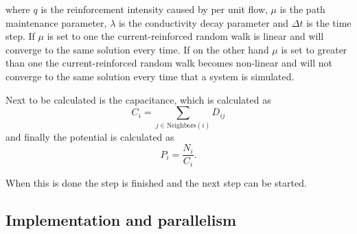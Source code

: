 where $q$ is the reinforcement intensity caused by per unit flow, $\mu$ is the path maintenance parameter, $\lambda$ is the conductivity decay parameter and $\Delta t$ is the time step. If $\mu$ is set to one the current-reinforced random walk is linear and will converge to the same solution every time. If on the other hand $\mu$ is set to greater than one the current-reinforced random walk becomes non-linear and will not converge to the same solution every time that a system is simulated. 

Next to be calculated is the capacitance, which is calculated as 
 \begin{equation}
 C_i = \sum_{j \in \text{Neighbors}(i)} D_{ij}
 \end{equation}
 and finally the potential is calculated as
 \begin{equation}
 P_i = \frac{N_i}{C_i}.
 \end{equation}
 
 \noindent When this is done the step is finished and the next step can be started.
 
 \subsection{Implementation and parallelism}